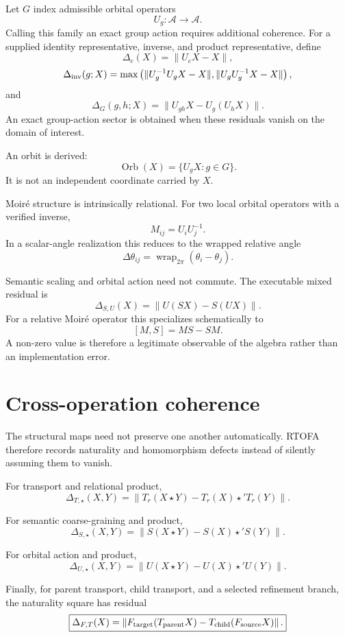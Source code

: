 \documentclass[11pt]{article}
\begin{document}
Let \(G\) index admissible orbital operators
\[
U_g:\mathcal A\to\mathcal A.
\]
Calling this family an exact group action requires additional coherence.
For a supplied identity representative, inverse, and product representative,
define
\[
\Delta_e(X)=\|U_eX-X\|,
\]
\[
\Delta_{\rm inv}(g;X)
=
\max\left(
\|U_g^{-1}U_gX-X\|,
\|U_gU_g^{-1}X-X\|
\right),
\]
and
\[
\Delta_G(g,h;X)
=
\|U_{gh}X-U_g(U_hX)\|.
\]
An exact group-action sector is obtained when these residuals vanish on the
domain of interest.

An orbit is derived:
\[
\boxed{
\operatorname{Orb}(X)=\{U_gX:g\in G\}.
}
\]
It is not an independent coordinate carried by \(X\).

Moir\'e structure is intrinsically relational. For two local orbital operators with a verified inverse,
\[
\boxed{
M_{ij}=U_iU_j^{-1}.
}
\tag{DER-M}
\]
In a scalar-angle realization this reduces to the wrapped relative angle
\[
\Delta\theta_{ij}
=\operatorname{wrap}_{2\pi}(\theta_i-\theta_j).
\]

Semantic scaling and orbital action need not commute. The executable mixed
residual is
\[
\boxed{
\Delta_{S,U}(X)
=
\|U(SX)-S(UX)\|.
}
\]
For a relative Moir\'e operator this specializes schematically to
\[
[M,S]=MS-SM.
\]
A non-zero value is therefore a legitimate observable of the algebra rather
than an implementation error.

\section{Cross-operation coherence}

The structural maps need not preserve one another automatically. RTOFA
therefore records naturality and homomorphism defects instead of silently
assuming them to vanish.

For transport and relational product,
\[
\boxed{
\Delta_{T,\star}(X,Y)
=
\left\|
T_r(X\star Y)
-
T_r(X)\star' T_r(Y)
\right\|.
}
\]

For semantic coarse-graining and product,
\[
\boxed{
\Delta_{S,\star}(X,Y)
=
\left\|
S(X\star Y)
-
S(X)\star' S(Y)
\right\|.
}
\]

For orbital action and product,
\[
\boxed{
\Delta_{U,\star}(X,Y)
=
\left\|
U(X\star Y)
-
U(X)\star' U(Y)
\right\|.
}
\]

Finally, for parent transport, child transport, and a selected refinement
branch, the naturality square has residual
\[
\boxed{
\Delta_{F,T}(X)
=
\left\|
F_{\rm target}(T_{\rm parent}X)
-
T_{\rm child}(F_{\rm source}X)
\right\|.
}
\]
\end{document}
